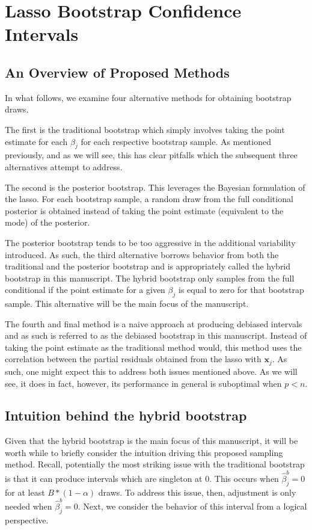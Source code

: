 \section{Lasso Bootstrap Confidence Intervals}

\subsection{An Overview of Proposed Methods}

In what follows, we examine four alternative methods for obtaining bootstrap draws.

The first is the traditional bootstrap which simply involves taking the point estimate for each $\beta_j$ for each respective bootstrap sample. As mentioned previously, and as we will see, this has clear pitfalls which the subsequent three alternatives attempt to address.

The second is the posterior bootstrap. This leverages the Bayesian formulation of the lasso. For each bootstrap sample, a random draw from the full conditional posterior is obtained instead of taking the point estimate (equivalent to the mode) of the posterior.

The posterior bootstrap tends to be too aggressive in the additional variability introduced. As such, the third alternative borrows behavior from both the traditional and the posterior bootstrap and is appropriately called the hybrid bootstrap in this manuscript. The hybrid bootstrap only samples from the full conditional if the point estimate for a given $\beta_j$ is equal to zero for that bootstrap sample. This alternative will be the main focus of the manuscript.

The fourth and final method is a naive approach at producing debiased intervals and as such is referred to as the debiased bootstrap in this manuscript. Instead of taking the point estimate as the traditional method would, this method uses the correlation between the partial residuals obtained from the lasso with $\boldsymbol{x}_j$. As such, one might expect this to address both issues mentioned above. As we will see, it does in fact, however, its performance in general is suboptimal when $p < n$.

\subsection{Intuition behind the hybrid bootstrap}

Given that the hybrid bootstrap is the main focus of this manuscript, it will be worth while to briefly consider the intuition driving this proposed sampling method. Recall, potentially the most striking issue with the traditional bootstrap is that it can produce intervals which are singleton at 0. This occurs when $\hat{\beta}_j^b = 0$ for at least $B * (1 - \alpha)$ draws. To address this issue, then, adjustment is only needed when $\hat{\beta}_j^{b} = 0$. Next, we consider the behavior of this interval from a logical perspective.

